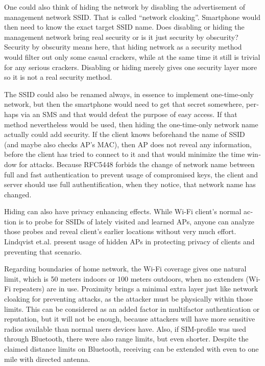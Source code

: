 \documentclass[12pt,a4paper,english]{tutthesis}
\begin{document}
\begin{otherlanguage}{english}
\label{tag:hidessid}
One could also think of hiding the network by disabling the
advertisement of manage\-ment network SSID. That is called ``network
cloaking''.  Smartphone would then need to know the exact target SSID name.
Does disabling or hiding the management network bring real security or
is it just security by obscurity?  Security by obscurity means here,
that hiding network 
as a security method would filter out only some casual crackers, while
at the same time it still is trivial for any serious crackers.
Disabling or hiding  merely gives one security layer more so it is not
a real security method.

The SSID could also be renamed always, in essence to implement
one-time-only network, but then the smartphone would need to get that
secret somewhere, perhaps via an SMS and that would defeat the purpose
of easy access.  If that method nevertheless would be used, then
hiding the one-time-only network name actually could add security. 
If the client knows beforehand the name of SSID
(and maybe also checks AP's MAC), then AP does not reveal any information,
before the client has tried to connect to it and that would minimize
the time window for attacks. 
Because RFC5448\cite[p.12]{rfc5448} forbids the change of network name between full and
fast authentication to prevent usage of compromised keys, the client
and server should use full authentification, when they notice, that
network name has changed.




 Hiding can also have privacy enhancing effects.
While Wi-Fi client's normal action is to probe for SSIDs of lately visited
and learned APs, anyone can analyze those probes and reveal client's
earlier locations without very much effort.
Lindqvist et.al.\cite{hidden-wlan} present usage of hidden
APs in protecting privacy of clients and preventing that scenario.



Regarding boundaries of home network, the Wi-Fi coverage gives 
one natural limit, which is 50 meters indoors or 100 meters outdoors,
when no extenders (Wi-Fi repeaters) are in use.
Proximity brings a minimal extra layer just like network cloaking 
for preventing attacks, as the attacker must be physically within
those limits.
This can be considered as an added factor in multifactor
authentication or reputation, but it will not be enough, because
attackers will have more sensitive  radios available than normal users
devices have. 
Also, if SIM-profile was used through Bluetooth, there were also
range limits, but even shorter. Despite the claimed distance limits
on Bluetooth, receiving can be extended with even to one mile with
directed antenna\cite{SANS-bluetooth-2007}.





\end{otherlanguage}
\end{document}

